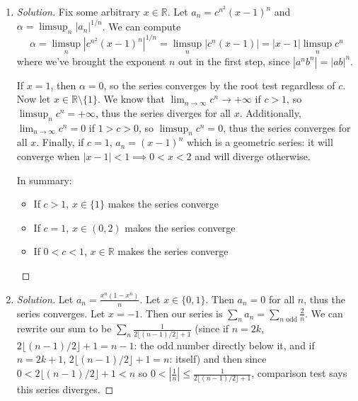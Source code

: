 \documentclass{article}
\newcommand{\R}{{\mathbb R}}
\begin{document}
\begin{enumerate}
	\item \begin{proof}[Solution]\let\qed\relax
		Fix some arbitrary $x \in \R$.
		Let $a_n = c^{n^2}(x-1)^n$
		and $\alpha = \limsup_n|a_n|^{1/n}$.
		We can compute
		\[
			\alpha = \limsup_n \left\lvert c^{n^2}(x-1)^n\right\rvert^{1/n}
			= \limsup_n \left\lvert c^n(x-1)\right\rvert
			= \left\lvert x-1\right\rvert\limsup_n c^n
		\]
		where we've brought the exponent $n$ out in the first step,
		since $|a^nb^n| = |ab|^n$.

		If $x = 1$, then $\alpha = 0$,
		so the series converges by the root test regardless of $c$.
		Now let $x \in \R\setminus\{1\}$.
		We know that $\lim_{n\to\infty} c^n \to +\infty$ if $c > 1$,
		so $\limsup_n c^n = +\infty$, thus the series diverges for all $x$.
		Additionally, $\lim_{n\to\infty}c^n = 0$ if $1 > c > 0$,
		so $\limsup_n c^n = 0$, thus the series converges for all $x$.
		Finally, if $c = 1$, $a_n = (x-1)^n$ which is a geometric series:
		it will converge when $|x-1| < 1 \implies 0 < x < 2$ and will diverge otherwise.

		In summary:
		\begin{itemize}
			\item If $c > 1$, $x \in \{1\}$ makes the series converge
			\item If $c = 1$, $x \in (0,2)$ makes the series converge
			\item If $0 < c < 1$, $x \in \R$ makes the series converge
		\end{itemize}
	\end{proof}
	\item \begin{proof}[Solution]\let\qed\relax
		Let $a_n = \frac{x^n(1-x^n)}{n}$.
		Let $x \in \{0,1\}$.
		Then $a_n = 0$ for all $n$, thus the series converges.
		Let $x = -1$.
		Then our series is $\sum_n a_n = \sum_{n\text{ odd}}\frac{2}{n}$.
		We can rewrite our sum to be $\sum_{n}\frac{1}{2\lfloor (n-1)/2\rfloor+1}$
		(since if $n = 2k$, $2\lfloor (n-1)/2\rfloor+1 =n - 1$: the odd
		number directly below it,
		and if $n = 2k+1$, $2\lfloor (n-1)/2\rfloor+1 = n$: itself)
		and then since $0 <2\lfloor (n-1)/2\rfloor+1<n$
		so $0 < \left\lvert\frac{1}{n}\right\rvert
		\leq \frac{1}{2\lfloor (n-1)/2\rfloor+1}$,
		comparison test says this series diverges.
		

\end{proof}
\end{enumerate}
\end{document}
